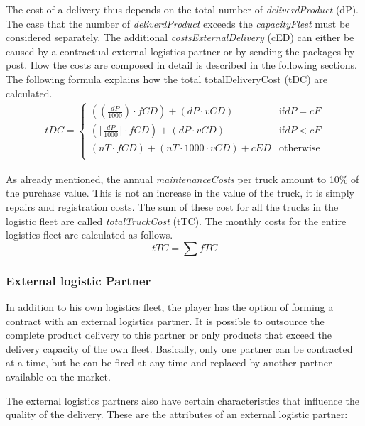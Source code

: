 The cost of a delivery thus depends on the total number of \textit{deliverdProduct} (\gls{dP}). 
The case that the number of \textit{deliverdProduct} exceeds the \textit{capacityFleet} must be considered separately. The additional \textit{costsExternalDelivery} (\gls{cED}) can either be caused by a contractual external logistics partner or by sending the packages by post. How the costs are composed in detail is described in the following sections. \\
The following formula explains how the total totalDeliveryCost (\gls{tDC}) are calculated. 
\begin{equation}
\label{func:deliveryCost}
\begin{aligned}
tDC = 
\begin{cases}
    (( \frac{dP}{1000} ) \cdot fCD) + ( dP \cdot vCD) & \text{if} dP = cF\\
    (\lceil \frac{dP}{1000} \rceil \cdot fCD ) + ( dP \cdot vCD) & \text{if} dP < cF\\
    ( nT \cdot fCD ) + ( nT \cdot1000 \cdot vCD ) + cED & \text{otherwise}\\
\end{cases}
\end{aligned}
\end{equation}

As already mentioned, the annual \textit{maintenanceCosts}  per truck amount to 10\% of the purchase value. This is not an increase in the value of the truck, it is simply repairs and registration costs. The sum of these cost for all the trucks in the logistic fleet are called \textit{totalTruckCost} (\gls{tTC}). The monthly costs for the entire logistics fleet are calculated as follows. 
\begin{equation}
    tTC = \sum fTC
\end{equation}


\subsubsection{External logistic Partner}
In addition to his own logistics fleet, the player has the option of forming a contract with an external logistics partner. It is possible to outsource the complete product delivery to this partner or only products that exceed the delivery capacity of the own fleet. Basically, only one partner can be contracted at a time, but he can be fired at any time and replaced by another partner available on the market. 

The external logistics partners also have certain characteristics that influence the quality of the delivery. These are the attributes of an external logistic partner:  


